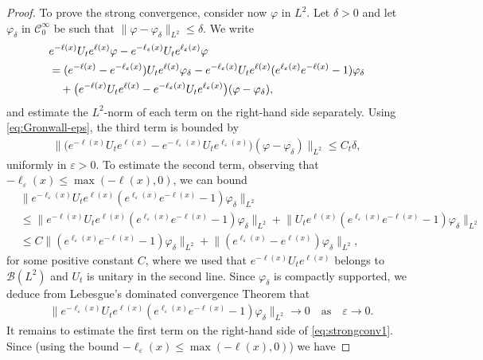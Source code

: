 \documentclass[12pt]{article}
\theoremstyle{plain}
\begin{document}
\begin{proof}
To prove the strong convergence, consider now $\varphi$ in $L^2$. Let $\delta>0$ and let $\varphi_\delta$ in $\mathcal{C}_0^\infty$ be such that $\|\varphi-\varphi_\delta\|_{L^2}\le\delta$. We write
\begin{align}
   & e^{-\ell(x)}U_te^{\ell(x)}\varphi-e^{-\ell_\varepsilon(x)}U_te^{\ell_\varepsilon(x)}\varphi\notag \\
    & = (e^{-\ell(x)}-e^{-\ell_\varepsilon(x)})U_te^{\ell(x)}\varphi_\delta-e^{-\ell_\varepsilon(x)}U_te^{\ell(x)}(e^{\ell_\varepsilon(x)}e^{-\ell(x)}-1)\varphi_\delta\notag \\
    &\quad+ \big(e^{-\ell(x)}U_te^{\ell(x)}-e^{-\ell_\varepsilon(x)}U_te^{\ell_\varepsilon(x)}\big)(\varphi-\varphi_\delta),\label{eq:strongconv1}
\end{align}
and estimate the $L^2$-norm of each term on the right-hand side separately. Using \eqref{eq:Gronwall-eps}, the third term is bounded by
\begin{align}
   \big\| \big(e^{-\ell(x)}U_te^{\ell(x)}-e^{-\ell_\varepsilon(x)}U_te^{\ell_\varepsilon(x)}\big)(\varphi-\varphi_\delta)\big\|_{L^2}\le C_t\delta, \label{eq:strongconv2}
\end{align}
uniformly in $\varepsilon>0$. To estimate the second term, observing that $-\ell_\varepsilon(x)\le\max(-\ell(x),0)$, we can bound
\begin{align*}
   & \big\|e^{-\ell_\varepsilon(x)}U_te^{\ell(x)}(e^{\ell_\varepsilon(x)}e^{-\ell(x)}-1)\varphi_\delta\big\|_{L^2}\\
   &\le\big\|e^{-\ell(x)}U_te^{\ell(x)}(e^{\ell_\varepsilon(x)}e^{-\ell(x)}-1)\varphi_\delta\big\|_{L^2}+\big\|U_te^{\ell(x)}(e^{\ell_\varepsilon(x)}e^{-\ell(x)}-1)\varphi_\delta\big\|_{L^2}\\
   &\le C\big\|(e^{\ell_\varepsilon(x)}e^{-\ell(x)}-1)\varphi_\delta\big\|_{L^2}+\big\|(e^{\ell_\varepsilon(x)}-e^{\ell(x)})\varphi_\delta\big\|_{L^2},
\end{align*}
for some positive constant $C$, where we used that $e^{-\ell(x)}U_te^{\ell(x)}$ belongs to $\mathcal{B}(L^2)$ and $U_t$ is unitary in the second line. Since $\varphi_\delta$ is compactly supported, we deduce from Lebesgue's dominated convergence Theorem that
\begin{align}
   & \big\|e^{-\ell_\varepsilon(x)}U_te^{\ell(x)}(e^{\ell_\varepsilon(x)}e^{-\ell(x)}-1)\varphi_\delta\big\|_{L^2}\to 0 \quad\text{as}\quad  \varepsilon\to0.\label{eq:strongconv3}
\end{align}
It remains to estimate the first term on the right-hand side of \eqref{eq:strongconv1}. Since (using the bound $-\ell_\varepsilon(x)\le\max(-\ell(x),0)$) we have

\end{proof}
\end{document}
